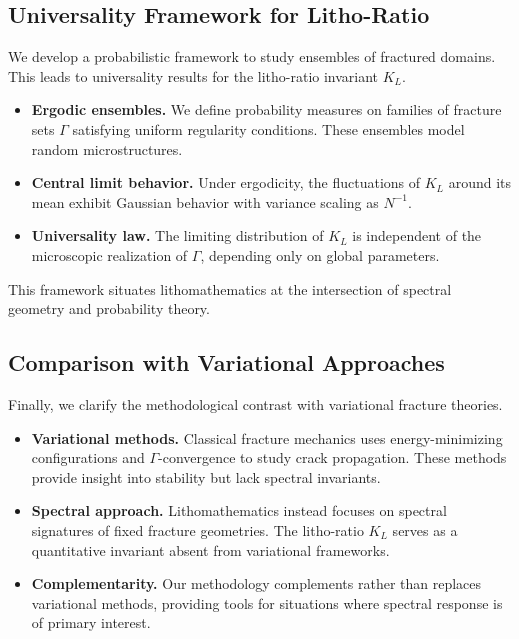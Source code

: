 \subsection{Universality Framework for Litho-Ratio}

We develop a probabilistic framework to study ensembles of fractured domains.
This leads to universality results for the litho-ratio invariant $K_L$.

\begin{itemize}
  \item \textbf{Ergodic ensembles.} We define probability measures on families
  of fracture sets $\Gamma$ satisfying uniform regularity conditions. These
  ensembles model random microstructures.
  \item \textbf{Central limit behavior.} Under ergodicity, the fluctuations of
  $K_L$ around its mean exhibit Gaussian behavior with variance scaling as
  $N^{-1}$.
  \item \textbf{Universality law.} The limiting distribution of $K_L$ is
  independent of the microscopic realization of $\Gamma$, depending only on
  global parameters.
\end{itemize}

This framework situates lithomathematics at the intersection of spectral
geometry and probability theory.

\subsection{Comparison with Variational Approaches}

Finally, we clarify the methodological contrast with variational fracture
theories.

\begin{itemize}
  \item \textbf{Variational methods.} Classical fracture mechanics uses
  energy-minimizing configurations and $\Gamma$-convergence to study crack
  propagation. These methods provide insight into stability but lack spectral
  invariants.
  \item \textbf{Spectral approach.} Lithomathematics instead focuses on
  spectral signatures of fixed fracture geometries. The litho-ratio $K_L$
  serves as a quantitative invariant absent from variational frameworks.
  \item \textbf{Complementarity.} Our methodology complements rather than
  replaces variational methods, providing tools for situations where spectral
  response is of primary interest.
\end{itemize}

